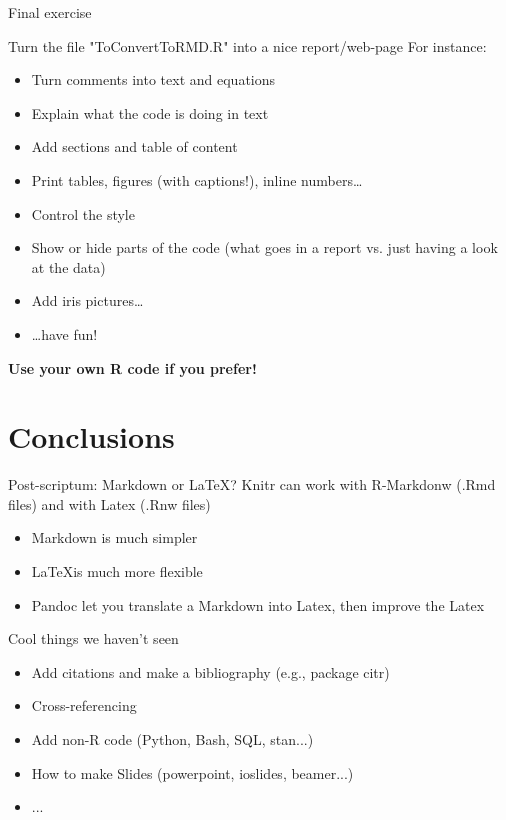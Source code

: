 \documentclass[10pt]{beamer}\usepackage[]{graphicx}\usepackage[]{color}
\begin{document}

\begin{frame}{Final exercise}

Turn the file "ToConvertToRMD.R" into a nice report/web-page
For instance:
\begin{itemize}
  \item Turn comments into text and equations
  \item Explain what the code is doing in text
  \item Add sections and table of content
  \item Print tables, figures (with captions!), inline numbers\dots
  \item Control the style
  \item Show or hide parts of the code (what goes in a report vs. just having a look at the data)
  \item Add iris pictures\dots
  \item \dots have fun!
\end{itemize}

\textbf{Use your own R code if you prefer!}

\end{frame}


\section{Conclusions}


\begin{frame}{Post-scriptum: Markdown or \LaTeX?}
Knitr can work with R-Markdonw (.Rmd files) and with Latex (.Rnw files)
\begin{itemize}
  \item Markdown is much simpler
  \item \LaTeX is much more flexible
  \item Pandoc let you translate a Markdown into Latex, then improve the Latex
\end{itemize}
\end{frame}

\begin{frame}{Cool things we haven't seen}
\begin{itemize}
  \item Add citations and make a bibliography (e.g., package citr)
  \item Cross-referencing
  \item Add non-R code (Python, Bash, SQL, stan...)
  \item How to make Slides (powerpoint, ioslides, beamer...)
  \item ...
\end{itemize}
\end{frame}
\end{document}
